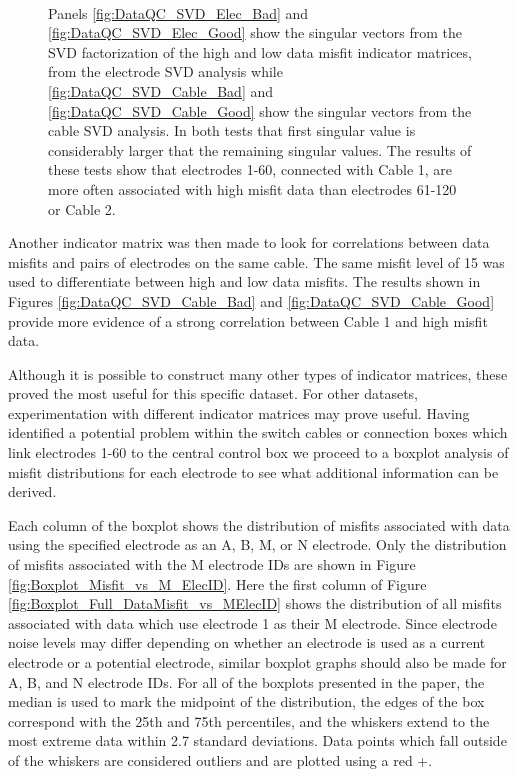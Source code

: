\documentclass[final,authoryear,5p,times,twocolumn]{elsarticle}
\begin{document}
\begin{figure} [!ht]
\begin{center}
{       } \\%
    \end{center}
\caption{Panels \ref{fig:DataQC_SVD_Elec_Bad} and \ref{fig:DataQC_SVD_Elec_Good} show the singular vectors from the SVD factorization of the high and low data misfit indicator matrices, from the electrode SVD analysis while \ref{fig:DataQC_SVD_Cable_Bad} and \ref{fig:DataQC_SVD_Cable_Good} show the singular vectors from the cable SVD analysis. In both tests that first singular value is considerably larger that the remaining singular values. The results of these tests show that electrodes 1-60, connected with Cable 1, are more often associated with high misfit data than electrodes 61-120 or Cable 2.} 
\label{fig:DataQC_SVD_ElecCable}
\end{figure} 

Another indicator matrix was then made to look for correlations between data misfits and pairs of electrodes on the same cable. The same misfit level of 15 was used to differentiate between high and low data misfits. The results shown in Figures \ref{fig:DataQC_SVD_Cable_Bad} and \ref{fig:DataQC_SVD_Cable_Good} provide more evidence of a strong correlation between Cable 1 and high misfit data. 

Although it is possible to construct many other types of indicator matrices, these proved the most useful for this specific dataset. For other datasets, experimentation with different indicator matrices may prove useful. Having identified a potential problem within the switch cables or connection boxes which link electrodes 1-60 to the central control box we proceed to a boxplot analysis of misfit distributions for each electrode to see what additional information can be derived.     

Each column of the boxplot shows the distribution of misfits associated with data using the specified electrode as an A, B, M, or N electrode. Only the distribution of misfits associated with the M electrode IDs are shown in Figure \ref{fig:Boxplot_Misfit_vs_M_ElecID}. Here the first column of Figure \ref{fig:Boxplot_Full_DataMisfit_vs_MElecID} shows the distribution of all misfits associated with data which use electrode 1 as their M electrode. Since electrode noise levels may differ depending on whether an electrode is used as a current electrode or a potential electrode, similar boxplot graphs should also be made for A, B, and N electrode IDs. For all of the boxplots presented in the paper, the median is used to mark the midpoint of the distribution, the edges of the box correspond with the 25th and 75th percentiles, and the whiskers extend to the most extreme data within 2.7 standard deviations. Data points which fall outside of the whiskers are considered outliers and are plotted using a red +.
\end{document}

